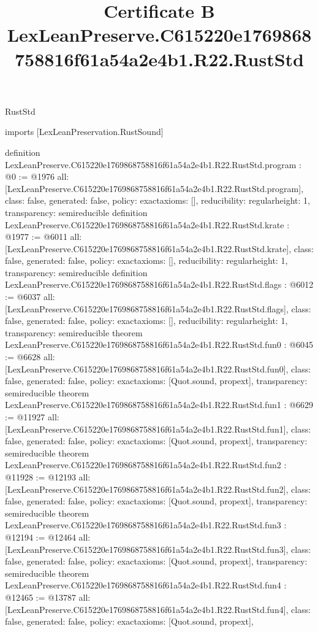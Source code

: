 \begin{lexlean}{RustStd}
\title{Certificate B LexLeanPreserve.C615220e1769868758816f61a54a2e4b1.R22.RustStd}
\begin{coremodule}
imports [LexLeanPreservation.RustSound]

definition LexLeanPreserve.C615220e1769868758816f61a54a2e4b1.R22.RustStd.program : @0 := @1976 {
  all: [LexLeanPreserve.C615220e1769868758816f61a54a2e4b1.R22.RustStd.program],
  class: false,
  generated: false,
  policy: exact{axioms: []},
  reducibility: regular{height: 1},
  transparency: semireducible
}
definition LexLeanPreserve.C615220e1769868758816f61a54a2e4b1.R22.RustStd.krate : @1977 := @6011 {
  all: [LexLeanPreserve.C615220e1769868758816f61a54a2e4b1.R22.RustStd.krate],
  class: false,
  generated: false,
  policy: exact{axioms: []},
  reducibility: regular{height: 1},
  transparency: semireducible
}
definition LexLeanPreserve.C615220e1769868758816f61a54a2e4b1.R22.RustStd.flags : @6012 := @6037 {
  all: [LexLeanPreserve.C615220e1769868758816f61a54a2e4b1.R22.RustStd.flags],
  class: false,
  generated: false,
  policy: exact{axioms: []},
  reducibility: regular{height: 1},
  transparency: semireducible
}
theorem LexLeanPreserve.C615220e1769868758816f61a54a2e4b1.R22.RustStd.fun0 : @6045 := @6628 {
  all: [LexLeanPreserve.C615220e1769868758816f61a54a2e4b1.R22.RustStd.fun0],
  class: false,
  generated: false,
  policy: exact{axioms: [Quot.sound, propext]},
  transparency: semireducible
}
theorem LexLeanPreserve.C615220e1769868758816f61a54a2e4b1.R22.RustStd.fun1 : @6629 := @11927 {
  all: [LexLeanPreserve.C615220e1769868758816f61a54a2e4b1.R22.RustStd.fun1],
  class: false,
  generated: false,
  policy: exact{axioms: [Quot.sound, propext]},
  transparency: semireducible
}
theorem LexLeanPreserve.C615220e1769868758816f61a54a2e4b1.R22.RustStd.fun2 : @11928 := @12193 {
  all: [LexLeanPreserve.C615220e1769868758816f61a54a2e4b1.R22.RustStd.fun2],
  class: false,
  generated: false,
  policy: exact{axioms: [Quot.sound, propext]},
  transparency: semireducible
}
theorem LexLeanPreserve.C615220e1769868758816f61a54a2e4b1.R22.RustStd.fun3 : @12194 := @12464 {
  all: [LexLeanPreserve.C615220e1769868758816f61a54a2e4b1.R22.RustStd.fun3],
  class: false,
  generated: false,
  policy: exact{axioms: [Quot.sound, propext]},
  transparency: semireducible
}
theorem LexLeanPreserve.C615220e1769868758816f61a54a2e4b1.R22.RustStd.fun4 : @12465 := @13787 {
  all: [LexLeanPreserve.C615220e1769868758816f61a54a2e4b1.R22.RustStd.fun4],
  class: false,
  generated: false,
  policy: exact{axioms: [Quot.sound, propext]},
}
\end{coremodule}
\end{lexlean}
